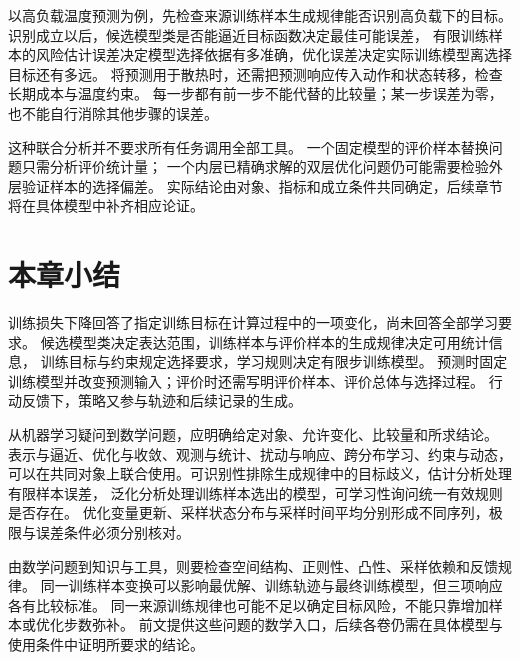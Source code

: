 以高负载温度预测为例，先检查来源训练样本生成规律能否识别高负载下的目标。
识别成立以后，候选模型类是否能逼近目标函数决定最佳可能误差，
有限训练样本的风险估计误差决定模型选择依据有多准确，优化误差决定实际训练模型离选择目标还有多远。
将预测用于散热时，还需把预测响应传入动作和状态转移，检查长期成本与温度约束。
每一步都有前一步不能代替的比较量；某一步误差为零，也不能自行消除其他步骤的误差。

这种联合分析并不要求所有任务调用全部工具。
一个固定模型的评价样本替换问题只需分析评价统计量；
一个内层已精确求解的双层优化问题仍可能需要检验外层验证样本的选择偏差。
实际结论由对象、指标和成立条件共同确定，后续章节将在具体模型中补齐相应论证。

\FloatBarrier
\section{本章小结}
\label{sec:future-summary}

训练损失下降回答了指定训练目标在计算过程中的一项变化，尚未回答全部学习要求。
候选模型类决定表达范围，训练样本与评价样本的生成规律决定可用统计信息，
训练目标与约束规定选择要求，学习规则决定有限步训练模型。
预测时固定训练模型并改变预测输入；评价时还需写明评价样本、评价总体与选择过程。
行动反馈下，策略又参与轨迹和后续记录的生成。

从机器学习疑问到数学问题，应明确给定对象、允许变化、比较量和所求结论。
表示与逼近、优化与收敛、观测与统计、扰动与响应、跨分布学习、约束与动态，
可以在共同对象上联合使用。可识别性排除生成规律中的目标歧义，估计分析处理有限样本误差，
泛化分析处理训练样本选出的模型，可学习性询问统一有效规则是否存在。
优化变量更新、采样状态分布与采样时间平均分别形成不同序列，极限与误差条件必须分别核对。

由数学问题到知识与工具，则要检查空间结构、正则性、凸性、采样依赖和反馈规律。
同一训练样本变换可以影响最优解、训练轨迹与最终训练模型，但三项响应各有比较标准。
同一来源训练规律也可能不足以确定目标风险，不能只靠增加样本或优化步数弥补。
前文提供这些问题的数学入口，后续各卷仍需在具体模型与使用条件中证明所要求的结论。
